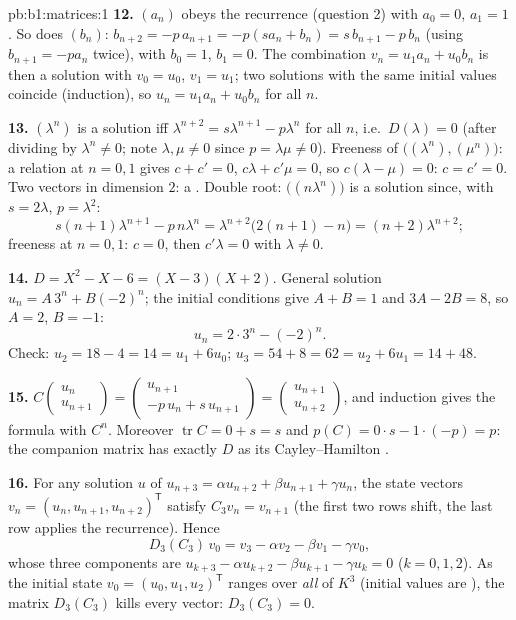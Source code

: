 \begin{solution}{pb:b1:matrices:1}
\textbf{12.} $(a_n)$ obeys the recurrence (question 2) with $a_0
= 0$, $a_1 = 1$. So does $(b_n)$: $b_{n+2} = -p\,a_{n+1} =
-p(s a_n + b_n) = s\,b_{n+1} - p\,b_n$ (using $b_{n+1} = -pa_n$
twice), with $b_0 = 1$, $b_1 = 0$. The combination $v_n =
u_1 a_n + u_0 b_n$ is then a solution with $v_0 = u_0$, $v_1 =
u_1$; two solutions with the same initial values coincide
(induction), so $u_n = u_1 a_n + u_0 b_n$ for all $n$.

\textbf{13.} $(\lambda^n)$ is a solution iff $\lambda^{n+2} =
s\lambda^{n+1} - p\lambda^n$ for all $n$, i.e.\ $D(\lambda) = 0$
(after dividing by $\lambda^n \neq 0$; note $\lambda, \mu \neq
0$ since $p = \lambda\mu \neq 0$). Freeness of
$\bigl((\lambda^n), (\mu^n)\bigr)$: a relation at $n = 0, 1$
gives $c + c' = 0$, $c\lambda + c'\mu = 0$, so $c(\lambda - \mu)
= 0$: $c = c' = 0$. Two  vectors in dimension $2$: a .
Double root: $\bigl((n\lambda^n)\bigr)$ is a solution since,
with $s = 2\lambda$, $p = \lambda^2$:
\[
s(n+1)\lambda^{n+1} - p\,n\lambda^n
= \lambda^{n+2}\bigl(2(n+1) - n\bigr) = (n+2)\lambda^{n+2} ;
\]
freeness at $n = 0, 1$: $c = 0$, then $c'\lambda = 0$ with
$\lambda \neq 0$.

\textbf{14.} $D = X^2 - X - 6 = (X - 3)(X + 2)$. General
solution $u_n = A\,3^n + B(-2)^n$; the initial conditions give
$A + B = 1$ and $3A - 2B = 8$, so $A = 2$, $B = -1$:
\[
u_n = 2\cdot 3^n - (-2)^n .
\]
Check: $u_2 = 18 - 4 = 14 = u_1 + 6u_0$; $u_3 = 54 + 8 = 62 =
u_2 + 6u_1 = 14 + 48$.

\textbf{15.} $C\begin{pmatrix} u_n\\ u_{n+1}\end{pmatrix} =
\begin{pmatrix} u_{n+1}\\ -p\,u_n + s\,u_{n+1}\end{pmatrix} =
\begin{pmatrix} u_{n+1}\\ u_{n+2}\end{pmatrix}$, and induction
gives the formula with $C^n$. Moreover $\operatorname{tr} C = 0
+ s = s$ and $p(C) = 0\cdot s - 1\cdot(-p) = p$: the companion
matrix has exactly $D$ as its Cayley--Hamilton .

\textbf{16.} For any solution $u$ of $u_{n+3} = \alpha u_{n+2} +
\beta u_{n+1} + \gamma u_n$, the state vectors $v_n = (u_n,
u_{n+1}, u_{n+2})^{\mathsf T}$ satisfy $C_3 v_n = v_{n+1}$
(the first two rows shift, the last row applies the
recurrence). Hence
\[
D_3(C_3)\,v_0 = v_3 - \alpha v_2 - \beta v_1 - \gamma v_0 ,
\]
whose three components are $u_{k+3} - \alpha u_{k+2} - \beta
u_{k+1} - \gamma u_k = 0$ ($k = 0, 1, 2$). As the initial state
$v_0 = (u_0, u_1, u_2)^{\mathsf T}$ ranges over \emph{all} of
$K^3$ (initial values are ), the matrix $D_3(C_3)$ kills
every vector: $D_3(C_3) = 0$.


\end{solution}
